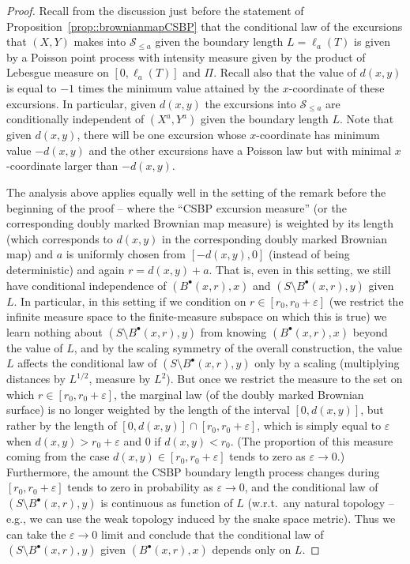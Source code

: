 \documentclass[JEP,XML,SOM,Unicode]{cedram}
\let\mathcal\mathscr
\newcommand{\sbullet}{{\scriptscriptstyle\bullet}}
\let\epsilon\varepsilon
\theoremstyle{plain}
\numberwithin{theorem}{section}
\theoremstyle{definition}
\newcommand{\snake}{{\mathcal S}}
\newcommand{\fb}[2]{B^\sbullet(#1,#2)}
\begin{document}
\begin{proof}
Recall from the discussion just before the statement of Proposition~\ref{prop::brownianmapCSBP} that the conditional law of the excursions that $(X,Y)$ makes into $\snake_{\leq a}$ given the boundary length $L = \ell_a(T)$ is given by a Poisson point process with intensity measure given by the product of Lebesgue measure on $[0,\ell_a(T)]$ and $\Pi$. Recall also that the value of $d(x,y)$ is equal to $-1$ times the minimum value attained by the $x$-coordinate of these excursions. In particular, given $d(x,y)$ the excursions into $\snake_{\leq a}$ are conditionally independent of $(X^a,Y^a)$ given the boundary length $L$. Note that given $d(x,y)$, there will be one excursion whose $x$-coordinate has minimum value $-d(x,y)$ and the other excursions have a Poisson law but with minimal $x$-coordinate larger than $-d(x,y)$.

The analysis above applies equally well in the setting of the remark before the beginning of the proof -- where the ``CSBP excursion measure'' (or the corresponding doubly marked Brownian map measure) is weighted by its length (which corresponds to $d(x,y)$ in the corresponding doubly marked Brownian map) and $a$ is uniformly chosen from $[-d(x,y), 0]$ (instead of being deterministic) and again $r = d(x,y) + a$. That is, even in this setting, we still have conditional independence of $(\fb{x}{r},x)$ and $(S \setminus \fb{x}{r},y)$ given $L$. In particular, in this setting if we condition on $r \in [r_0, r_0 + \epsilon]$ (\ie we restrict the infinite measure space to the finite-measure subspace on which this is true) we learn nothing about $(S \setminus \fb{x}{r},y)$ from knowing $(\fb{x}{r},x)$ beyond the value of $L$, and by the scaling symmetry of the overall construction, the value $L$ affects the conditional law of $(S \setminus \fb{x}{r},y)$ only by a scaling (multiplying distances by $L^{1/2}$, measure by $L^2$). But once we restrict the measure to the set on which $r \in [r_0, r_0 + \epsilon]$, the marginal law (of the doubly marked Brownian surface) is no longer weighted by the length of the interval $[0,d(x,y)]$, but rather by the length of $[0,d(x,y)] \cap [r_0, r_0 + \epsilon]$, which is simply equal to $\epsilon$ when $d(x,y) > r_0 + \epsilon$ and $0$ if $d(x,y) < r_0$. (The proportion of this measure coming from the case $d(x,y) \in [r_0, r_0+\epsilon]$ tends to zero as $\epsilon \to 0$.) Furthermore, the amount the CSBP boundary length process changes during $[r_0, r_0+\epsilon]$ tends to zero in probability as $\epsilon \to 0$, and the conditional law of $(S \setminus \fb{x}{r},y)$ is continuous as function of $L$ (w.r.t.\ any natural topology -- e.g., we can use the weak topology induced by the snake space metric). Thus we can take the $\epsilon \to 0$ limit and conclude that the conditional law of $(S \setminus \fb{x}{r},y)$ given $(\fb{x}{r},x)$ depends only on $L$.
\end{proof}
\end{document}
